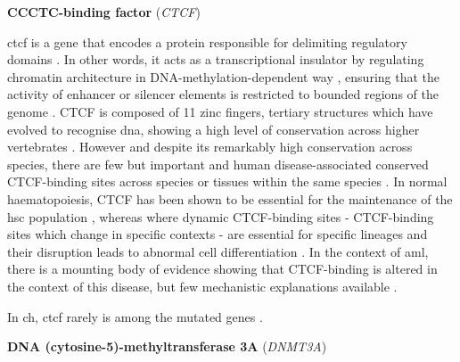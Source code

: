 \noindent \textbf{CCCTC-binding factor} (\textit{CTCF})

\Ac{ctcf} is a gene that encodes a protein responsible for delimiting regulatory domains \cite{Jeong2004-xv}. In other words, it acts as a transcriptional insulator by regulating chromatin architecture in DNA-methylation-dependent way \cite{Wang2012-gj}, ensuring that the activity of enhancer or silencer elements is restricted to bounded regions of the genome \cite{Kuhn2003-zj}. CTCF is composed of 11 zinc fingers, tertiary structures which have evolved to recognise \ac{dna}, showing a high level of conservation across higher vertebrates \cite{Filippova1996-lz}. However and despite its remarkably high conservation across species, there are few but important and human disease-associated conserved CTCF-binding sites across species \cite{Martin2011-iz} or tissues within the same species \cite{Azazi2020-lr}. In normal haematopoiesis, CTCF has been shown to be essential for the maintenance of the \ac{hsc} population \cite{Kim2017-of}, whereas where dynamic CTCF-binding sites - CTCF-binding sites which change in specific contexts - are essential for specific lineages and their disruption leads to abnormal cell differentiation \cite{Qi2021-do}. In the context of \ac{aml}, there is a mounting body of evidence showing that CTCF-binding is altered in the context of this disease, but few mechanistic explanations available \cite{Qiu2020-wn}.

In \ac{ch}, \ac{ctcf} rarely is among the mutated genes \cite{Jaiswal2014-rl,Genovese2014-eu,Zehir2017-gh,Xie2014-np}.

\noindent \textbf{DNA (cytosine-5)-methyltransferase 3A} (\textit{DNMT3A})

